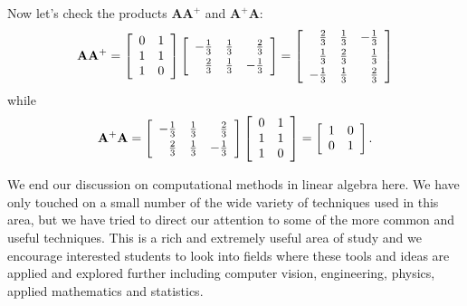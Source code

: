 Now let's check the products $\mathbf{AA^+}$ and $\mathbf{A^+A}$:
\[
\mathbf{A}\mathbf{A}^{+}=
\left[\begin{array}{cc}0&1\\1&1\\1&0\end{array}\right] 
\left[\begin{array}{rrr}
-\frac{1}{3}\vspace*{1mm}&\frac{1}{3}& \frac{2}{3}\\
\frac{2}{3} &\frac{1}{3} &-\frac{1}{3} 
\end{array}\right]
=
\left[\begin{array}{rrr}
\frac{2}{3}\vspace*{1mm}&\frac{1}{3}& -\frac{1}{3}\\
\frac{1}{3}\vspace*{1mm}&\frac{2}{3}& \frac{1}{3}\\
-\frac{1}{3} &\frac{1}{3} &\frac{2}{3} 
\end{array}\right]
\]
while 
\[
\mathbf{A}^{+}\mathbf{A}=
\left[\begin{array}{rrr}
-\frac{1}{3}\vspace*{1mm}&\frac{1}{3}& \frac{2}{3}\\
\frac{2}{3} &\frac{1}{3} &-\frac{1}{3} 
\end{array}\right]
\left[\begin{array}{cc}0&1\\1&1\\1&0\end{array}\right] 
=
\left[\begin{array}{cc}1&0\\0&1\end{array}\right].
\] \sqend


We end our discussion on computational methods in linear algebra here.  We have only touched on a small number of the wide variety of techniques used in this area, but we have tried to direct our attention to some of the more common and useful techniques.  This is a rich and extremely useful area of study and we encourage interested students to look into fields where these tools and ideas are applied and explored further including computer vision,  engineering, physics, applied mathematics and statistics.
